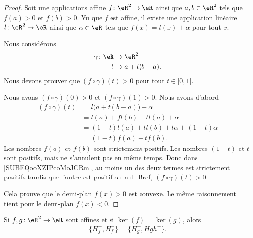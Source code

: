 \begin{proof}
    Soit une applications affine \( f\colon \eR^2\to\eR\) ainsi que \( a,b\in \eR^2\) tels que \( f(a)>0\) et \( f(b)>0\). Vu que \( f\) est affine, il existe une application linéaire \( l\colon \eR^2\to \eR\) ainsi que \( \alpha\in \eR\) tels que \( f(x)=l(x)+\alpha\) pour tout \( x\).
    
    Nous considérons
    \begin{equation}
        \begin{aligned}
            \gamma\colon \eR&\to \eR^2 \\
            t&\mapsto a+t(b-a). 
        \end{aligned}
    \end{equation}
    Nous devons prouver que \( (f\circ\gamma)(t)>0\) pour tout \( t\in\mathopen[ 0 , 1 \mathclose]\).

    Nous avons \( (f\circ\gamma)(0)>0\) et \( (f\circ\gamma)(1)>0\). Nous avons d'abord
    \begin{subequations}
        \begin{align}
            (f\circ\gamma)(t)&=l\big( a+t(b-a) \big)+\alpha\\
            &=l(a)+fl(b)-tl(a)+\alpha\\
            &=(1-t)l(a)+tl(b)+t\alpha+(1-t)\alpha\\
            &=(1-t)f(a)+tf(b).      \label{SUBEQooXZIPooMoJCRm}
        \end{align}
    \end{subequations}
    Les nombres \( f(a)\) et \( f(b)\) sont strictement positifs. Les nombres \( (1-t)\) et \( t\) sont positifs, mais ne s'annulent pas en même temps. Donc dans \eqref{SUBEQooXZIPooMoJCRm}, au moins un des deux termes est strictement positifs tandis que l'autre est positif ou nul. Bref, \( (f\circ\gamma)(t)>0\).

    Cela prouve que le demi-plan \( f(x)>0\) est convexe. Le même raisonnement tient pour le demi-plan \( f(x)<0\).
\end{proof}

\begin{lemma}        \label{LEMooXLNZooFyqPxG}
    Si \( f,g\colon \eR^2\to \eR\) sont affines et si \( \ker(f)=\ker(g)\), alors
    \begin{equation}
        \{H_f^+,H_f^-\}=\{ H_g^+,Hgh^- \}.
    \end{equation}
\end{lemma}

